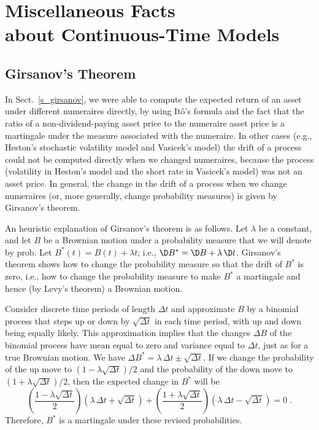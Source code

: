 \chapter[Miscellaneous Facts about Continuous-Time Models]{Miscellaneous Facts \\about Continuous-Time Models}

\section{Girsanov's Theorem}\label{a_girsanov}
In Sect.~\ref{s_girsanov}, we were able to compute the expected return of an asset under different numeraires directly, by using It\^o's formula and the fact that the ratio of a non-dividend-paying asset price to the numeraire asset price is a martingale under the measure associated with the numeraire.  In other cases (e.g., Heston's stochastic volatility model and Vasicek's model) the drift of a process could not be computed directly when we changed numeraires, because the process (volatility in Heston's model and the short rate in Vasicek's model) was not an asset price.  In general, the change in the drift of a process when we change numeraires (or, more generally, change probability measures) is given by Girsanov's theorem. 

An heuristic explanation of Girsanov's theorem is as follows.  Let
$\lambda$ be a constant, and let $B$ be a Brownian motion under a probability measure that we will denote by $\text{prob}$.  Let $B^*(t)=B(t)+\lambda t$; i.e., $\D B^* = \D B + \lambda\,\D t$.  
Girsanov's theorem shows how to change the probability measure so that the drift of $B^*$ is zero,
i.e., how to change the probability measure to make $B^*$ a martingale and hence (by Levy's theorem) a Brownian motion.

Consider discrete time periods of length $\varDelta t$ and  approximate $B$ by a binomial process that steps up or down by $\sqrt{\varDelta t}$ in each time period, with up and down being equally likely.  This approximation implies that the changes $\varDelta B$ of the binomial process have mean equal to zero and variance equal to $\varDelta t$, just as for a true Brownian motion.
We have $\varDelta B^*=\lambda\,\varDelta t\pm\sqrt{\varDelta t}$.  If we change the probability of the up move to $(1-\lambda\sqrt{\varDelta t})/2$ and the probability of the down move to $(1+\lambda\sqrt{\varDelta t})/2$, then the expected change in $B^*$ will be
$$\left(\frac{1-\lambda\sqrt{\varDelta t}}{2}\right)\left(\lambda\,\varDelta t+\sqrt{\varDelta t}\right)+
\left(\frac{1+\lambda\sqrt{\varDelta t}}{2}\right)
\left(\lambda\,\varDelta t-\sqrt{\varDelta t}\right) = 0\; .$$
Therefore, $B^*$ is a martingale under these revised probabilities.  

